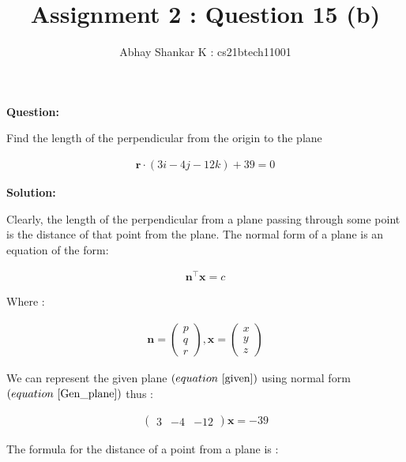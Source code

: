 \documentclass[journal,12pt,twocolumn]{IEEEtran}
\begin{document}
	\title{Assignment 2 : Question 15 (b)}
	\author{ Abhay Shankar K : cs21btech11001}

	\maketitle

	\bigskip

	\providecommand{\brak}[1]{\ensuremath{\left(#1\right)}}
	\providecommand{\abs}[1]{\left\vert#1\right\vert}
	\providecommand{\norm}[1]{\left\lVert#1\right\rVert}
	\newcommand{\solution}{\noindent \textbf{Solution: }}
	\newcommand{\question}{\noindent \textbf{Question: }}

	\newcommand{\myvec}[1]{\ensuremath{\begin{pmatrix}#1\end{pmatrix}}}
	\let\vec\mathbf


	\question


	Find the length of the perpendicular from the origin to the plane
	
	\begin{align} 
		\vec{r} \cdot \brak{3i - 4j - 12k} + 39 = 0
			\label{given}
	\end{align}


	\solution
	
	
	Clearly, the length of the perpendicular from a plane passing through some point is the distance of that point from the plane.
	The normal form of a plane is an equation of the form:
	
	\begin{align}
		\vec{n}^\top \vec{x} = c
			\label{Gen_plane}
	\end{align}


	Where :
	
	\begin{align}
		\vec{n} = \myvec{p \\ q \\ r}, 
		\vec{x} = \myvec{x \\ y \\ z}
	\end{align}


	We can represent the given plane \brak{equation ~\eqref{given}} using normal form \brak{equation ~\eqref{Gen_plane}} thus :
	
	\begin{align}
		\myvec{3 & -4 & -12} \vec{x} = -39
			\label{pln_nrm}
	\end{align}
	
	
	The formula for the distance of a point from a plane is :
	
\end{document}
